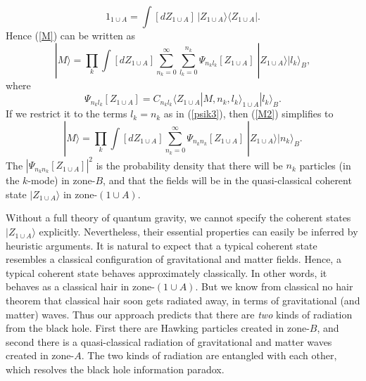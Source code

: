 \documentclass[12pt]{article}
\begin{document}
\begin{equation}\label{cohZ}
1_{1\cup A}=\int [dZ_{1\cup A}]\, |Z_{1\cup A}\rangle \langle Z_{1\cup A}| .
\end{equation}
Hence (\ref{M}) can be written as 
\begin{equation}\label{M2}
 |M\rangle = \prod_k \int [dZ_{1\cup A}] \sum_{n_k=0}^{\infty} \sum_{l_k=0}^{n_k} 
\Psi_{n_kl_k}[Z_{1\cup A}] \;  |Z_{1\cup A}\rangle |l_k\rangle_B ,
\end{equation}
where
\begin{equation}
\Psi_{n_kl_k}[Z_{1\cup A}]=C_{n_kl_k} \langle Z_{1\cup A}|M,n_k,l_k\rangle_{1\cup A} |l_k\rangle_B .
\end{equation}
If we restrict it to the terms $l_k=n_k$ as in (\ref{psik3}), then (\ref{M2}) simplifies to
\begin{equation}\label{M3}
 |M\rangle = \prod_k \int [dZ_{1\cup A}] \sum_{n_k=0}^{\infty}  
\Psi_{n_kn_k}[Z_{1\cup A}] \;  |Z_{1\cup A}\rangle |n_k\rangle_B .
\end{equation}
The $|\Psi_{n_kn_k}[Z_{1\cup A}]|^2$ is the probability density that there will be $n_k$ particles (in the $k$-mode)
in zone-$B$, and that the fields will be in the quasi-classical coherent state $|Z_{1\cup A}\rangle$
in zone-$(1\!\cup\!A)$.  

Without a full theory of quantum gravity, we cannot specify the coherent states $|Z_{1\cup A}\rangle$ explicitly.
Nevertheless, their essential properties can easily be inferred by heuristic arguments. It is natural to expect that 
a typical coherent state resembles a classical configuration of gravitational and matter fields. 
Hence, a typical coherent state behaves approximately classically. 
In other words, it behaves as a classical hair in zone-$(1\!\cup\!A)$. But we know from  
classical no hair theorem \cite{hawking-ellis,frolov-novikov} that classical hair soon gets radiated away, in terms 
of gravitational (and matter) waves. Thus our approach predicts that there are {\em two} kinds of radiation
from the black hole. First there are Hawking particles created in zone-$B$, and second there is a
quasi-classical radiation of gravitational and matter waves created in zone-$A$. 
The two kinds of radiation are entangled with each other, which resolves the black hole information paradox.
 
\end{document}
